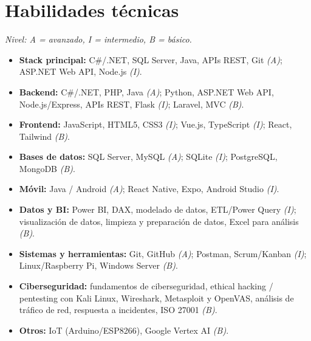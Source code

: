 \documentclass[11pt,a4paper]{article}
\begin{document}
\section{Habilidades técnicas}
\textit{Nivel: A = avanzado, I = intermedio, B = básico.}
\begin{itemize}
  \item \textbf{Stack principal:} C\#/.NET, SQL Server, Java, APIs REST, Git \textit{(A)}; ASP.NET Web API, Node.js \textit{(I)}.
  \item \textbf{Backend:} C\#/.NET, PHP, Java \textit{(A)}; Python, ASP.NET Web API, Node.js/Express, APIs REST, Flask \textit{(I)}; Laravel, MVC \textit{(B)}.
  \item \textbf{Frontend:} JavaScript, HTML5, CSS3 \textit{(I)}; Vue.js, TypeScript \textit{(I)}; React, Tailwind \textit{(B)}.
  \item \textbf{Bases de datos:} SQL Server, MySQL \textit{(A)}; SQLite \textit{(I)}; PostgreSQL, MongoDB \textit{(B)}.
  \item \textbf{Móvil:} Java / Android \textit{(A)}; React Native, Expo, Android Studio \textit{(I)}.
  \item \textbf{Datos y BI:} Power BI, DAX, modelado de datos, ETL/Power Query \textit{(I)}; visualización de datos, limpieza y preparación de datos, Excel para análisis \textit{(B)}.
  \item \textbf{Sistemas y herramientas:} Git, GitHub \textit{(A)}; Postman, Scrum/Kanban \textit{(I)}; Linux/Raspberry Pi, Windows Server \textit{(B)}.
  \item \textbf{Ciberseguridad:} fundamentos de ciberseguridad, ethical hacking / pentesting con Kali Linux, Wireshark, Metasploit y OpenVAS, análisis de tráfico de red, respuesta a incidentes, ISO 27001 \textit{(B)}.
  \item \textbf{Otros:} IoT (Arduino/ESP8266), Google Vertex AI \textit{(B)}.
\end{itemize}

\end{document}
